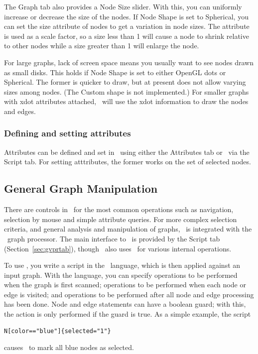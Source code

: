 The Graph tab also provides a Node Size slider. With this, you can uniformly
increase or decrease the size of the nodes. If Node Shape is set to Spherical,
you can set the size attribute of nodes to get a variation in node sizes. 
The attribute is used as a scale factor, so a size less than 1 will cause a node
to shrink relative to other nodes while a size greater than 1 will enlarge the node.

For large graphs, lack of screen space means you usually want to see nodes drawn as small disks.
This holds if Node Shape is set to either OpenGL dots or Spherical. The former is quicker to draw,
but at present does not allow varying sizes among nodes. (The Custom shape is not implemented.)
For smaller graphs with xdot attributes attached, \smyrna\ will use the xdot information to
draw the nodes and edges.  

\subsubsection {Defining and setting attributes}
Attributes can be defined and set in \smyrna\ using either the Attributes tab or \gvpr\ via the
Script tab. For setting atttributes, the former works on the set of selected nodes. 

\subsection{General Graph Manipulation}
\label{sec:gvpr}
There are controls in \smyrna\ for the most common operations such as navigation, selection
by mouse and simple attribute queries. For more complex selection criteria, and general
analysis and manipulation of graphs, \smyrna\ is integrated with the \gvpr\ graph processor. 
The main interface to \gvpr\ is provided by the Script tab (Section~\ref{sec:gvprtab}), though
\smyrna\ also uses \gvpr\ for various internal operations.

To use \gvpr, you write a script in the \gvpr\ language, which is then applied against an input 
graph. With the language, you can specify operations to be performed when the graph is first scanned;
operations to be performed when each node or edge is visited; and operations to be performed after
all node and edge processing has been done. Node and edge statements can have a boolean guard; with
this, the action is only performed if the guard is true.
As a simple example, the script
\begin{verbatim}
N[color=="blue"]{selected="1"}
\end{verbatim}
causes \gvpr\ to mark all blue nodes as selected.

